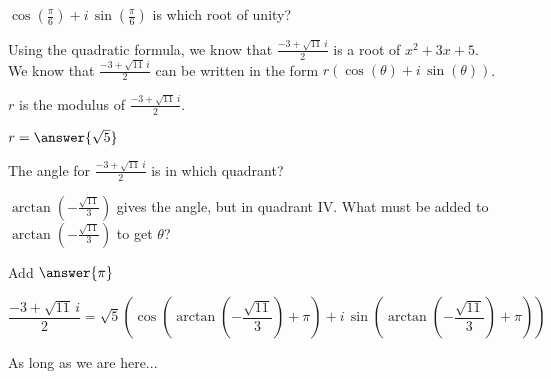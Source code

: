 \documentclass{ximera}
\begin{document}
\begin{question} 


$\cos\left( \frac{\pi}{6} \right) + i \, \sin\left( \frac{\pi}{6} \right)$ is which root of unity?

\begin{multipleChoice}
\end{multipleChoice}

\end{question}







\begin{example}


Using the quadratic formula, we know that $\frac{-3 + \sqrt{11} \, i}{2}$ is a root of $x^2 + 3x + 5$. \\

We know that $\frac{-3 + \sqrt{11} \, i}{2}$ can be written in the form $r (\cos(\theta) + i \, \sin(\theta))$.

$r$ is the modulus of $\frac{-3 + \sqrt{11} \, i}{2}$.

$r = \answer{\sqrt{5}}$ 

The angle for $\frac{-3 + \sqrt{11} \, i}{2}$ is in which quadrant?


\begin{multipleChoice}
\end{multipleChoice}


$\arctan\left( -\frac{\sqrt{11}}{3} \right)$ gives the angle, but in quadrant IV.    What must be added to $\arctan\left( -\frac{\sqrt{11}}{3} \right)$ to get $\theta$?

Add $\answer{\pi}$


\[   \frac{-3 + \sqrt{11} \, i}{2} = \sqrt{5} \left( \cos\left( \arctan\left( -\frac{\sqrt{11}}{3} \right) + \pi \right) + i \, \sin\left( \arctan\left( -\frac{\sqrt{11}}{3} \right) +\pi  \right) \right)     \]


\end{example}


As long as we are here...\\
\end{document}
